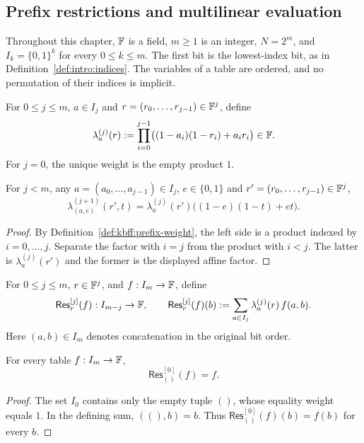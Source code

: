 \subsection{Prefix restrictions and multilinear evaluation}\label{sec:kbfoldfold:prefix}

Throughout this chapter, $\mathbb{F}$ is a field, $m\geq1$ is an integer, $N=2^m$, and $I_k=\{0,1\}^k$ for every $0\leq k\leq m$. The first bit is the lowest-index bit, as in Definition~\ref{def:intro:indices}. The variables of a table are ordered, and no permutation of their indices is implicit.

\begin{definition}\label{def:kbff:prefix-weight}
For $0\leq j\leq m$, $a\in I_j$ and $r=(r_0,\ldots,r_{j-1})\in\mathbb{F}^j$, define
\[
 \lambda^{(j)}_a(r)
 :=\prod_{i=0}^{j-1}\bigl((1-a_i)(1-r_i)+a_ir_i\bigr)\in\mathbb{F}.
\]
For $j=0$, the unique weight is the empty product $1$.
\end{definition}

\begin{lemma}\label{lem:kbff:weight-factor}
For $j<m$, any $a=(a_0,\ldots,a_{j-1})\in I_j$, $e\in\{0,1\}$ and $r'=(r_0,\ldots,r_{j-1})\in\mathbb{F}^j$,
\[
 \lambda^{(j+1)}_{(a,e)}(r',t)=
 \lambda^{(j)}_a(r')\bigl((1-e)(1-t)+et\bigr).
\]
\end{lemma}
\begin{proof}
By Definition~\ref{def:kbff:prefix-weight}, the left side is a product indexed by $i=0,\ldots,j$. Separate the factor with $i=j$ from the product with $i<j$. The latter is $\lambda^{(j)}_a(r')$ and the former is the displayed affine factor.
\end{proof}

\begin{definition}\label{def:kbff:prefix-restriction}
For $0\leq j\leq m$, $r\in\mathbb{F}^j$, and $f:I_m\to\mathbb{F}$, define
\[
 \mathsf{Res}^{[j]}_r(f):I_{m-j}\to\mathbb{F},\qquad
 \mathsf{Res}^{[j]}_r(f)(b)
   :=\sum_{a\in I_j}\lambda^{(j)}_a(r)\,f(a,b).
\]
Here $(a,b)\in I_m$ denotes concatenation in the original bit order.
\end{definition}

\begin{lemma}\label{lem:kbff:prefix-zero}
For every table $f:I_m\to\mathbb{F}$,
\[
 \mathsf{Res}^{[0]}_{()}(f)=f.
\]
\end{lemma}
\begin{proof}
The set $I_0$ contains only the empty tuple $()$, whose equality weight equals $1$. In the defining sum, $((),b)=b$. Thus $\mathsf{Res}^{[0]}_{()}(f)(b)=f(b)$ for every $b$.
\end{proof}

